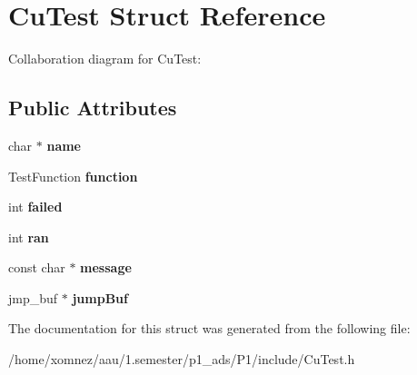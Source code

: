 \hypertarget{structCuTest}{}\section{Cu\+Test Struct Reference}
\label{structCuTest}


Collaboration diagram for Cu\+Test\+:
\subsection*{Public Attributes}
\begin{DoxyCompactItemize}
\item 
\mbox{\label{structCuTest_a6140dfce23321636d106d95efd4ccb93}} 
char $\ast$ {\bfseries name}
\item 
\mbox{\label{structCuTest_aac05c072bbf8b5ad2c1a1950633efbe5}} 
Test\+Function {\bfseries function}
\item 
\mbox{\label{structCuTest_af1334871dff4cf1e0e50d960952378e8}} 
int {\bfseries failed}
\item 
\mbox{\label{structCuTest_ae64f485765a24240e367d4a700855d24}} 
int {\bfseries ran}
\item 
\mbox{\label{structCuTest_a5d76ed2474dcc113ff4dd475db12b5a5}} 
const char $\ast$ {\bfseries message}
\item 
\mbox{\label{structCuTest_a7b96017be4b823324175a4aa9616def0}} 
jmp\+\_\+buf $\ast$ {\bfseries jump\+Buf}
\end{DoxyCompactItemize}


The documentation for this struct was generated from the following file\+:\begin{DoxyCompactItemize}
\item 
/home/xomnez/aau/1.\+semester/p1\+\_\+ads/\+P1/include/Cu\+Test.\+h\end{DoxyCompactItemize}
